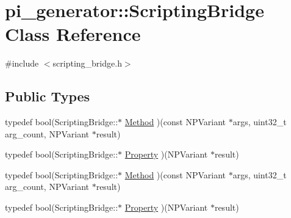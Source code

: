 \hypertarget{classpi__generator_1_1_scripting_bridge}{
\section{pi\_\-generator::ScriptingBridge Class Reference}
\label{classpi__generator_1_1_scripting_bridge}
}


{\ttfamily \#include $<$scripting\_\-bridge.h$>$}

\subsection*{Public Types}
\begin{DoxyCompactItemize}
\item 
typedef bool(ScriptingBridge::$\ast$ \hyperlink{classpi__generator_1_1_scripting_bridge_a48f5f7b0dfb3daabcdbfb3f7b667fd39}{Method} )(const NPVariant $\ast$args, uint32\_\-t arg\_\-count, NPVariant $\ast$result)
\item 
typedef bool(ScriptingBridge::$\ast$ \hyperlink{classpi__generator_1_1_scripting_bridge_abcd8cffa7f26f348e68cde316038245f}{Property} )(NPVariant $\ast$result)
\item 
typedef bool(ScriptingBridge::$\ast$ \hyperlink{classpi__generator_1_1_scripting_bridge_a48f5f7b0dfb3daabcdbfb3f7b667fd39}{Method} )(const NPVariant $\ast$args, uint32\_\-t arg\_\-count, NPVariant $\ast$result)
\item 
typedef bool(ScriptingBridge::$\ast$ \hyperlink{classpi__generator_1_1_scripting_bridge_abcd8cffa7f26f348e68cde316038245f}{Property} )(NPVariant $\ast$result)
\end{DoxyCompactItemize}
